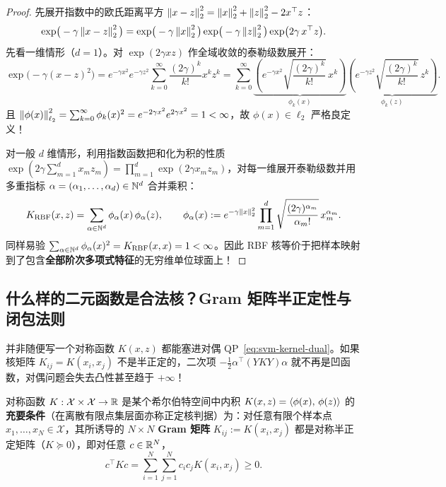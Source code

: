 \begin{proof}
先展开指数中的欧氏距离平方 $\left\|x - z\right\|_2^2 = \left\|x\right\|_2^2 + \left\|z\right\|_2^2 - 2 x^\top z$：
\[
  \exp\!\big(-\gamma\left\|x - z\right\|_2^2\big)
  = \exp\!\big(-\gamma\left\|x\right\|_2^2\big) \exp\!\big(-\gamma\left\|z\right\|_2^2\big) \exp\!\big(2\gamma\, x^\top z\big).
\]
先看一维情形（$d = 1$）。对 $\exp(2\gamma x z)$ 作全域收敛的泰勒级数展开：
\[
  \exp\!\big(-\gamma(x - z)^2\big)
  = e^{-\gamma x^2} e^{-\gamma z^2} \sum_{k=0}^{\infty} \frac{(2\gamma)^k}{k!} x^k z^k
  = \sum_{k=0}^{\infty} \underbrace{\left(e^{-\gamma x^2}\sqrt{\frac{(2\gamma)^k}{k!}}\, x^k\right)}_{\phi_k(x)}
                        \underbrace{\left(e^{-\gamma z^2}\sqrt{\frac{(2\gamma)^k}{k!}}\, z^k\right)}_{\phi_k(z)}.
\]
且 $\left\|\phi(x)\right\|_{\ell_2}^2 = \sum_{k=0}^{\infty} \phi_k(x)^2 = e^{-2\gamma x^2} e^{2\gamma x^2} = 1 < \infty$，故 $\phi(x) \in \ell_2$ 严格良定义！

对一般 $d$ 维情形，利用指数函数把和化为积的性质 $\exp(2\gamma \sum_{m=1}^d x_m z_m) = \prod_{m=1}^d \exp(2\gamma x_m z_m)$，对每一维展开泰勒级数并用多重指标 $\alpha = (\alpha_1, \dots, \alpha_d) \in \mathbb{N}^d$ 合并乘积：
\[
  K_{\mathrm{RBF}}(x, z)
  = \sum_{\alpha \in \mathbb{N}^d} \phi_\alpha(x)\,\phi_\alpha(z),
  \qquad
  \phi_\alpha(x) := e^{-\gamma \left\|x\right\|_2^2} \prod_{m=1}^{d} \sqrt{\frac{(2\gamma)^{\alpha_m}}{\alpha_m!}}\, x_m^{\alpha_m}.
\]
同样易验 $\sum_{\alpha \in \mathbb{N}^d} \phi_\alpha(x)^2 = K_{\mathrm{RBF}}(x, x) = 1 < \infty$。因此 RBF 核等价于把样本映射到了包含\textbf{全部阶次多项式特征}的无穷维单位球面上！
\end{proof}

\subsection{什么样的二元函数是合法核？Gram 矩阵半正定性与闭包法则}

并非随便写一个对称函数 $K(x, z)$ 都能塞进对偶 QP~\eqref{eq:svm-kernel-dual}。如果核矩阵 $K_{ij} = K(x_i, x_j)$ 不是半正定的，二次项 $-\frac{1}{2}\alpha^\top (Y K Y) \alpha$ 就不再是凹函数，对偶问题会失去凸性甚至趋于 $+\infty$！

\begin{thmBox}
\begin{theorem}\label{thm:mercer}
对称函数 $K: \mathcal{X} \times \mathcal{X} \to \mathbb{R}$ 是某个希尔伯特空间中内积 $K(x, z) = \left\langle \phi(x),\, \phi(z) \right\rangle$ 的\textbf{充要条件}（在离散有限点集层面亦称正定核判据）为：对任意有限个样本点 $x_1, \dots, x_N \in \mathcal{X}$，其所诱导的 $N \times N$ \textbf{Gram 矩阵} $K_{ij} := K(x_i, x_j)$ 都是对称半正定矩阵（$K \succeq 0$），即对任意 $c \in \mathbb{R}^N$，
\begin{equation}\label{eq:gram-psd}
  c^\top K c = \sum_{i=1}^{N}\sum_{j=1}^{N} c_i c_j K(x_i, x_j) \ge 0.
\end{equation}
\end{theorem}
\end{thmBox}

